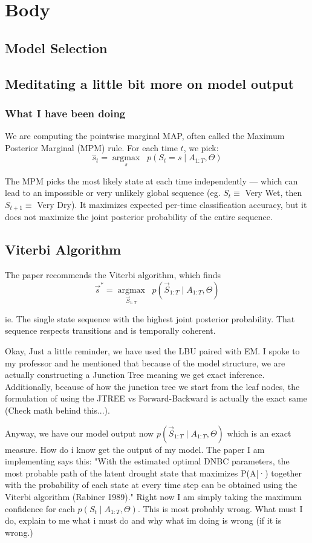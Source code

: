 \graphicspath{{body/fig/}}

\chapter{Body}
\label{chap:body}

\section{Model Selection}


\section{Meditating a little bit more on model output}

\subsection{What I have been doing}

We are computing the pointwise marginal MAP, often called the Maximum Posterior Marginal (MPM) rule. For each time 
$t$, we pick: 
\[
    \hat{s}_t = \underset{s}{\operatorname{argmax}} \;\; p(S_t = s \mid A_{1:T}, \Theta)
\]

The MPM picks the most likely state at each time independently — which can lead to an impossible or very unlikely global sequence (eg. $S_t \equiv$ Very Wet, then $S_{t+1} \equiv$ Very Dry). It maximizes expected per-time classification accuracy, but it does not maximize the joint posterior probability of the entire sequence.

\section{Viterbi Algorithm}

The paper recommends the Viterbi algorithm, which finds
\[
    \vec{s}^* = \underset{\vec{S}_{1:T}}{\operatorname{argmax}} \;\; p(\vec{S}_{1:T}\mid A_{1:T}, \Theta)
\]

ie. The single state sequence with the highest joint posterior probability. That sequence respects transitions and is temporally coherent.

Okay, Just a little reminder, we have used the LBU paired with EM. I spoke to my professor and he mentioned that because of the model structure, we are actually constructing a Junction Tree meaning we get exact inference. Additionally, because of how the junction tree we start from the leaf nodes, the formulation of using the JTREE vs Forward-Backward is actually the exact same (Check math behind this...). 

Anyway, we have our model output now $p(\vec{S}_{1:T} \mid A_{1:T}, \Theta)$ which is an exact measure. How do i know get the output of my model. The paper I am implementing says this: "With the estimated optimal DNBC parameters, the most probable path of the latent drought state that maximizes P(A|·) together with the probability of each state at every time step can be obtained using the Viterbi algorithm (Rabiner 1989)." Right now I am simply taking the maximum confidence for each $p(S_t \mid A_{1:T}, \Theta)$. This is most probably wrong. What must I do, explain to me what i must do and why what im doing is wrong (if it is wrong.)
